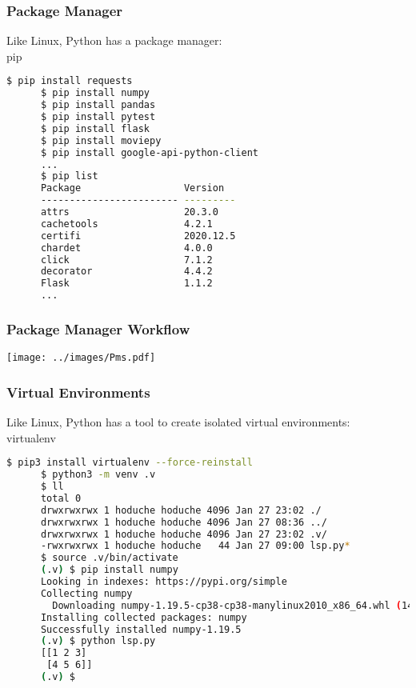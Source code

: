 \begin{frame}[fragile]\frametitle{Package Manager}
   \centering
   Like Linux,
   Python has a package manager: \\[2ex]
   \Huge pip \normalsize \\[2ex]
   \begin{lstlisting}[language=bash, style=bash, autogobble]
      $ pip install requests
      $ pip install numpy
      $ pip install pandas
      $ pip install pytest
      $ pip install flask
      $ pip install moviepy
      $ pip install google-api-python-client
      ...
      $ pip list
      Package                  Version
      ------------------------ ---------
      attrs                    20.3.0
      cachetools               4.2.1
      certifi                  2020.12.5
      chardet                  4.0.0
      click                    7.1.2
      decorator                4.4.2
      Flask                    1.1.2
      ...
   \end{lstlisting}
\end{frame}

\begin{frame}\frametitle{Package Manager Workflow}
   \centering
   \texttt{[image: ../images/Pms.pdf]}
\end{frame}

\begin{frame}[fragile]\frametitle{Virtual Environments}
   \centering
   Like Linux,
   Python has a tool to create isolated virtual environments: \\ [2ex]
   \Huge virtualenv \normalsize \\ [2ex]
   \begin{lstlisting}[language=bash, style=bash, autogobble]
      $ pip3 install virtualenv --force-reinstall
      $ python3 -m venv .v
      $ ll
      total 0
      drwxrwxrwx 1 hoduche hoduche 4096 Jan 27 23:02 ./
      drwxrwxrwx 1 hoduche hoduche 4096 Jan 27 08:36 ../
      drwxrwxrwx 1 hoduche hoduche 4096 Jan 27 23:02 .v/
      -rwxrwxrwx 1 hoduche hoduche   44 Jan 27 09:00 lsp.py*
      $ source .v/bin/activate
      (.v) $ pip install numpy
      Looking in indexes: https://pypi.org/simple
      Collecting numpy
        Downloading numpy-1.19.5-cp38-cp38-manylinux2010_x86_64.whl (14.9 MB)
      Installing collected packages: numpy
      Successfully installed numpy-1.19.5
      (.v) $ python lsp.py
      [[1 2 3]
       [4 5 6]]
      (.v) $
   \end{lstlisting}
\end{frame}

